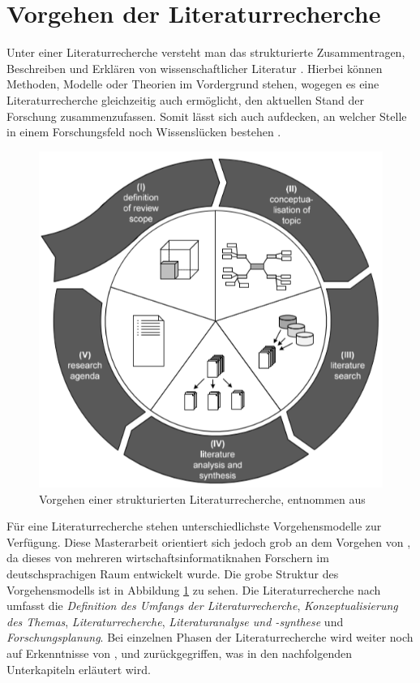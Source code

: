 \section{Vorgehen der Literaturrecherche}
\label{sec:VorgehenLiteraturrecherche}
Unter einer Literaturrecherche versteht man das strukturierte Zusammentragen, Beschreiben und Erklären von wissenschaftlicher Literatur \cite{cooper_organizing_1988}. Hierbei können Methoden, Modelle oder Theorien im Vordergrund stehen, wogegen es eine Literaturrecherche gleichzeitig auch ermöglicht, den aktuellen Stand der Forschung zusammenzufassen. Somit lässt sich auch aufdecken, an welcher Stelle in einem Forschungsfeld noch Wissenslücken bestehen \cite{cooper_organizing_1988, Webster2002AnalyzingTP}.

\begin{figure}
    \centering
    \includegraphics[scale=0.85]{pic/MA-Bilder/Model_vom_Brooke.PNG}
    \caption{Vorgehen einer strukturierten Literaturrecherche, entnommen aus \cite{vom_Brooke_2009}}
    \label{Fig:vomBrocke}
\end{figure}

Für eine Literaturrecherche stehen unterschiedlichste Vorgehensmodelle zur Verfügung. Diese Masterarbeit orientiert sich jedoch grob an dem Vorgehen von \cite{vom_Brooke_2009}, da dieses von mehreren wirtschaftsinformatiknahen Forschern im deutschsprachigen Raum entwickelt wurde. Die grobe Struktur des Vorgehensmodells ist in Abbildung \ref{Fig:vomBrocke} zu sehen. Die Literaturrecherche nach \cite{vom_Brooke_2009} umfasst die \emph{Definition des
Umfangs der Literaturrecherche}, \emph{Konzeptualisierung des Themas}, \emph{Literaturrecherche},
\emph{Literaturanalyse und -synthese} und \emph{Forschungsplanung}. Bei einzelnen Phasen der Literaturrecherche wird weiter noch auf Erkenntnisse von \cite{cooper_organizing_1988}, \cite{Brink.2013} und \cite{Webster2002AnalyzingTP} zurückgegriffen, was in den nachfolgenden Unterkapiteln erläutert wird.